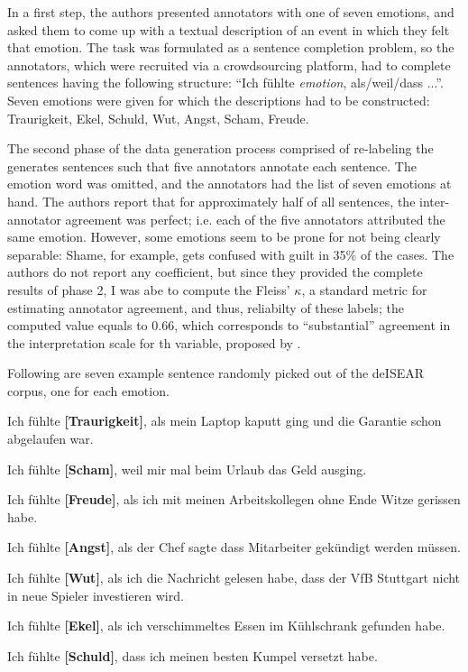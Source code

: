 In a first step, the authors presented annotators with one of seven emotions, and asked them to
come up with a textual description of an event in which they felt that emotion.
The task was formulated as a sentence completion problem, so the annotators, which were recruited via a
crowdsourcing platform, had to complete sentences having the following structure: ``Ich fühlte
\emph{emotion}, als/weil/dass ...''.
Seven emotions were given for which the descriptions had to be constructed:
Traurigkeit, Ekel, Schuld, Wut, Angst, Scham, Freude.

The second phase of the data generation process comprised of re-labeling the generates sentences
such that five annotators annotate each sentence. The emotion word was omitted, and the annotators
had the list of seven emotions at hand.
The authors report that for approximately half of all sentences, the inter-annotator agreement was perfect;
i.e. each of the five annotators attributed the same emotion. However, some emotions seem to be prone for
not being clearly separable: Shame, for example, gets confused with guilt in 35\% of the cases.
The authors do not report any coefficient, but since they provided the complete results of phase 2,
I was abe to compute the Fleiss' $\kappa$, a standard metric for estimating annotator agreement, and thus,
reliabilty of these labels; the computed value equals to 0.66, which corresponds to ``substantial'' agreement
in the interpretation scale for th variable, proposed by \cite{landis1977measurement}.

Following are seven example sentence randomly picked out of the deISEAR corpus, one for each emotion.

\begin{examples}
  \item Ich fühlte \textbf{[Traurigkeit]}, als mein Laptop kaputt ging und die Garantie schon abgelaufen war.
  \item Ich fühlte \textbf{[Scham]}, weil mir mal beim Urlaub das Geld ausging.
  \item Ich fühlte \textbf{[Freude]}, als ich mit meinen Arbeitskollegen ohne Ende Witze gerissen habe.
  \item Ich fühlte \textbf{[Angst]}, als der Chef sagte dass Mitarbeiter gekündigt werden müssen.
  \item Ich fühlte \textbf{[Wut]}, als ich die Nachricht gelesen habe, dass der VfB Stuttgart nicht in neue Spieler investieren wird.
  \item Ich fühlte \textbf{[Ekel]}, als ich verschimmeltes Essen im Kühlschrank gefunden habe.
  \item Ich fühlte \textbf{[Schuld]}, dass ich meinen besten Kumpel versetzt habe.
\end{examples}

